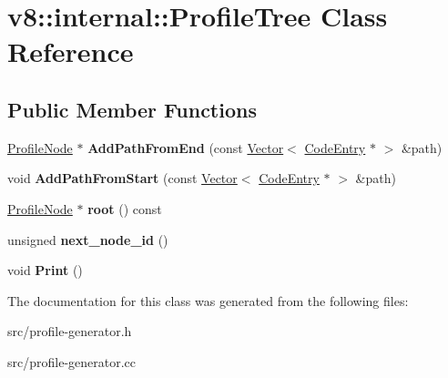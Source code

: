 \hypertarget{classv8_1_1internal_1_1_profile_tree}{}\section{v8\+:\+:internal\+:\+:Profile\+Tree Class Reference}
\label{classv8_1_1internal_1_1_profile_tree}
\subsection*{Public Member Functions}
\begin{DoxyCompactItemize}
\item 
\hypertarget{classv8_1_1internal_1_1_profile_tree_a722bb51a0caf14cdab8dbd0bad5cdbd3}{}\hyperlink{classv8_1_1internal_1_1_profile_node}{Profile\+Node} $\ast$ {\bfseries Add\+Path\+From\+End} (const \hyperlink{classv8_1_1internal_1_1_vector}{Vector}$<$ \hyperlink{classv8_1_1internal_1_1_code_entry}{Code\+Entry} $\ast$ $>$ \&path)\label{classv8_1_1internal_1_1_profile_tree_a722bb51a0caf14cdab8dbd0bad5cdbd3}

\item 
\hypertarget{classv8_1_1internal_1_1_profile_tree_adfa92faa52e269fa673166511eb0d7d3}{}void {\bfseries Add\+Path\+From\+Start} (const \hyperlink{classv8_1_1internal_1_1_vector}{Vector}$<$ \hyperlink{classv8_1_1internal_1_1_code_entry}{Code\+Entry} $\ast$ $>$ \&path)\label{classv8_1_1internal_1_1_profile_tree_adfa92faa52e269fa673166511eb0d7d3}

\item 
\hypertarget{classv8_1_1internal_1_1_profile_tree_abd2b62dab12fa95dd77c7aa50922fe25}{}\hyperlink{classv8_1_1internal_1_1_profile_node}{Profile\+Node} $\ast$ {\bfseries root} () const \label{classv8_1_1internal_1_1_profile_tree_abd2b62dab12fa95dd77c7aa50922fe25}

\item 
\hypertarget{classv8_1_1internal_1_1_profile_tree_a8f6da4826c203b27853dd938cc629afe}{}unsigned {\bfseries next\+\_\+node\+\_\+id} ()\label{classv8_1_1internal_1_1_profile_tree_a8f6da4826c203b27853dd938cc629afe}

\item 
\hypertarget{classv8_1_1internal_1_1_profile_tree_a8c898f6817801f67220153bfdba1c868}{}void {\bfseries Print} ()\label{classv8_1_1internal_1_1_profile_tree_a8c898f6817801f67220153bfdba1c868}

\end{DoxyCompactItemize}


The documentation for this class was generated from the following files\+:\begin{DoxyCompactItemize}
\item 
src/profile-\/generator.\+h\item 
src/profile-\/generator.\+cc\end{DoxyCompactItemize}
